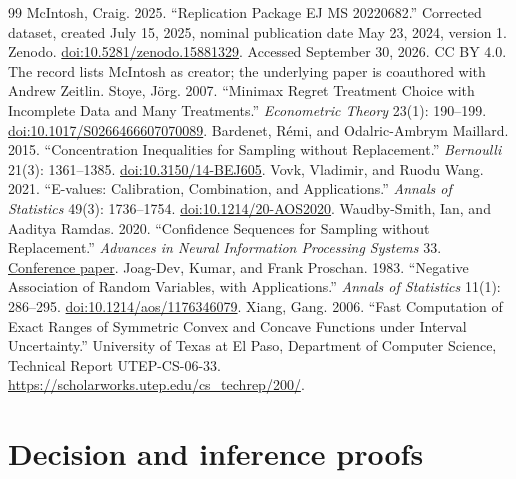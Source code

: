\documentclass[11pt]{article}
\begin{document}
\begin{singlespace}
\begin{thebibliography}{99}
 McIntosh, Craig. 2025. ``Replication Package EJ MS 20220682.'' Corrected dataset, created July 15, 2025, nominal publication date May 23, 2024, version 1. Zenodo. \href{https://doi.org/10.5281/zenodo.15881329}{doi:10.5281/zenodo.15881329}. Accessed September 30, 2026. CC BY 4.0. The record lists McIntosh as creator; the underlying paper is coauthored with Andrew Zeitlin.
 Stoye, J\"org. 2007. ``Minimax Regret Treatment Choice with Incomplete Data and Many Treatments.'' \emph{Econometric Theory} 23(1): 190--199. \href{https://doi.org/10.1017/S0266466607070089}{doi:10.1017/S0266466607070089}.
 Bardenet, R\'emi, and Odalric-Ambrym Maillard. 2015. ``Concentration Inequalities for Sampling without Replacement.'' \emph{Bernoulli} 21(3): 1361--1385. \href{https://doi.org/10.3150/14-BEJ605}{doi:10.3150/14-BEJ605}.
 Vovk, Vladimir, and Ruodu Wang. 2021. ``E-values: Calibration, Combination, and Applications.'' \emph{Annals of Statistics} 49(3): 1736--1754. \href{https://doi.org/10.1214/20-AOS2020}{doi:10.1214/20-AOS2020}.
 Waudby-Smith, Ian, and Aaditya Ramdas. 2020. ``Confidence Sequences for Sampling without Replacement.'' \emph{Advances in Neural Information Processing Systems} 33. \href{https://proceedings.neurips.cc/paper_files/paper/2020/file/e96c7de8f6390b1e6c71556e4e0a4959-Paper.pdf}{Conference paper}.
 Joag-Dev, Kumar, and Frank Proschan. 1983. ``Negative Association of Random Variables, with Applications.'' \emph{Annals of Statistics} 11(1): 286--295. \href{https://doi.org/10.1214/aos/1176346079}{doi:10.1214/aos/1176346079}.
 Xiang, Gang. 2006. ``Fast Computation of Exact Ranges of Symmetric Convex and Concave Functions under Interval Uncertainty.'' University of Texas at El Paso, Department of Computer Science, Technical Report UTEP-CS-06-33. \url{https://scholarworks.utep.edu/cs_techrep/200/}.
\end{thebibliography}
\end{singlespace}\normalsize

\clearpage
\clearpage\appendix
\singlespacing
\section{Decision and inference proofs}\label{app:proofs}
\end{document}
